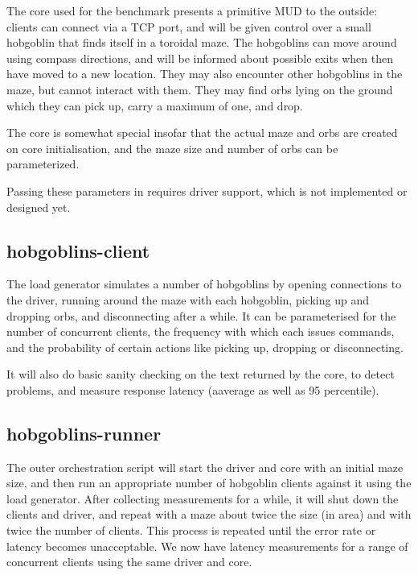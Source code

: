 \documentclass[12pt,a4paper]{article}
\begin{document}
The core used for the benchmark presents a primitive MUD to the outside: clients
can connect via a TCP port, and will be given control over a small hobgoblin
that finds itself in a toroidal maze. The hobgoblins can move around using
compass directions, and will be informed about possible exits when then have
moved to a new location. They may also encounter other hobgoblins in the maze,
but cannot interact with them. They may find orbs lying on the ground which they
can pick up, carry a maximum of one, and drop. 

The core is somewhat special insofar that the actual maze and orbs are created
on core initialisation, and the maze size and number of orbs can be parameterized. 

\begin{notes}
\item Passing these parameters in requires driver support, which is not
implemented or designed yet.
\end{notes}

\subsection{hobgoblins-client}\label{sec:hg_client}

The load generator simulates a number of hobgoblins by opening connections to
the driver, running around the maze with each hobgoblin, picking up and dropping
orbs, and disconnecting after a while. It can be parameterised for the number of
concurrent clients, the frequency with which each issues commands, and the
probability of certain actions like picking up, dropping or disconnecting.

It will also do basic sanity checking on the text returned by the core, to
detect problems, and measure response latency (aaverage as well as 95
percentile).

\subsection{hobgoblins-runner}\label{sec:hg_runner}

The outer orchestration script will start the driver and core with an initial
maze size, and then run an appropriate number of hobgoblin clients against it
using the load generator. After collecting measurements for a while, it will
shut down the clients and driver, and repeat with a maze about twice the size
(in area) and with twice the number of clients. This process is repeated until
the error rate or latency becomes unacceptable. We now have latency measurements
for a range of concurrent clients using the same driver and core.
\end{document}

